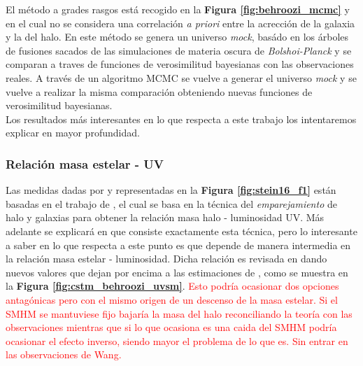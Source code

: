 El método a grades rasgos está recogido en la \textbf{Figura \ref{fig:behroozi_mcmc}} y en  el cual no se considera una correlación \textit{a priori} entre la acrección de la galaxia y la del halo. En este método se genera un universo \textit{mock}, basádo en los árboles de fusiones sacados de las simulaciones de materia oscura de \textit{Bolshoi-Planck} y se comparan a traves de funciones de verosimilitud bayesianas con las observaciones reales. A través de un algoritmo MCMC se vuelve a generar el universo \textit{mock} y se vuelve a realizar la misma comparación obteniendo nuevas funciones de verosimilitud bayesianas. \\

Los resultados más interesantes en lo que respecta a este trabajo los intentaremos explicar en mayor profundidad.

\subsubsection{Relación masa estelar - UV} 
Las medidas dadas por \cite{bouwens2015reionization} y \cite{bouwens2015uv} representadas en la \textbf{Figura \ref{fig:stein16_f1}} están basadas en el trabajo de \cite{finkelstein2015increasing}, el cual se basa en la técnica del \textit{emparejamiento} de halo y galaxias para obtener la relación masa halo - luminosidad UV. Más adelante se explicará en que consiste exactamente esta técnica, pero lo interesante a saber en lo que respecta a este punto es que depende de manera intermedia en la relación masa estelar - luminosidad. Dicha relación es revisada en \cite{behroozi2019universemachine} dando nuevos valores que dejan por encima a las estimaciones de \cite{finkelstein2015increasing},\cite{finkelstein2015evolution} como se muestra en la \textbf{Figura \ref{fig:cstm_behroozi_uvsm}}.  \textcolor{red}{Esto podría ocasionar dos opciones antagónicas pero con el mismo origen de un descenso de la masa estelar. Si el SMHM se mantuviese fijo bajaría la masa del halo reconciliando la teoría con las observaciones mientras que si lo que ocasiona es una caida del SMHM podría ocasionar el efecto inverso, siendo mayor el problema de lo que es. Sin entrar en las observaciones de Wang. }
	

